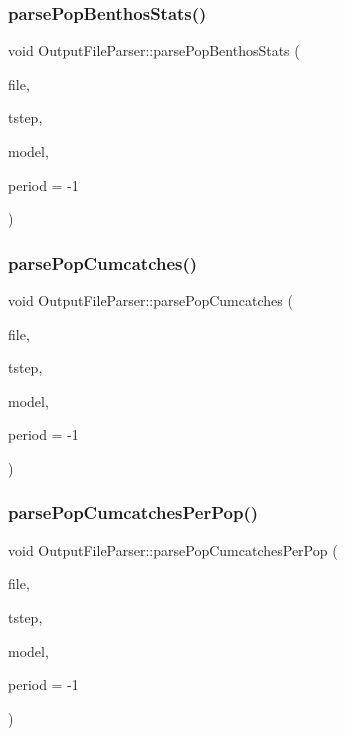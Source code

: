\subsubsection{\texorpdfstring{parsePopBenthosStats()}{parsePopBenthosStats()}}
{\footnotesize\ttfamily void Output\+File\+Parser\+::parse\+Pop\+Benthos\+Stats (\begin{DoxyParamCaption}\item[{Q\+File $\ast$}]{file,  }\item[{int}]{tstep,  }\item[{\mbox{\hyperlink{class_displace_model}{Displace\+Model}} $\ast$}]{model,  }\item[{int}]{period = {\ttfamily -\/1} }\end{DoxyParamCaption})\hspace{0.3cm}{\ttfamily [protected]}}

\mbox{\label{class_output_file_parser_a6ef610f6c4343c47ffbb7525b0496ef4}} 
\subsubsection{\texorpdfstring{parsePopCumcatches()}{parsePopCumcatches()}}
{\footnotesize\ttfamily void Output\+File\+Parser\+::parse\+Pop\+Cumcatches (\begin{DoxyParamCaption}\item[{Q\+File $\ast$}]{file,  }\item[{int}]{tstep,  }\item[{\mbox{\hyperlink{class_displace_model}{Displace\+Model}} $\ast$}]{model,  }\item[{int}]{period = {\ttfamily -\/1} }\end{DoxyParamCaption})\hspace{0.3cm}{\ttfamily [protected]}}

\mbox{\label{class_output_file_parser_a76118b94b1cf3428eb8babfc448a8416}} 
\subsubsection{\texorpdfstring{parsePopCumcatchesPerPop()}{parsePopCumcatchesPerPop()}}
{\footnotesize\ttfamily void Output\+File\+Parser\+::parse\+Pop\+Cumcatches\+Per\+Pop (\begin{DoxyParamCaption}\item[{Q\+File $\ast$}]{file,  }\item[{int}]{tstep,  }\item[{\mbox{\hyperlink{class_displace_model}{Displace\+Model}} $\ast$}]{model,  }\item[{int}]{period = {\ttfamily -\/1} }\end{DoxyParamCaption})\hspace{0.3cm}{\ttfamily [protected]}}

